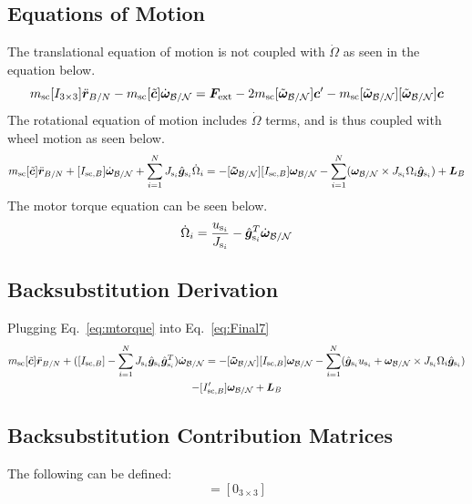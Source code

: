 \documentclass[]{BasiliskReportMemo}
\begin{document}
\subsection{Equations of Motion}
The translational equation of motion is not coupled with $\dot{\Omega}$ as seen in the equation below.
\begin{equation}
m_{\text{sc}} [I_{3 \times 3}]\ddot{\bm r}_{B/N}
-m_{\text{sc}} [\tilde{\bm{c}}] \dot{\bm\omega}_{\cal B/N}
= \bm F_{\text{ext}}- 2 m_{\text{sc}} [\tilde{\bm\omega}_{\cal B/N}] \bm c'
-m_{\text{sc}} [\tilde{\bm\omega}_{\cal B/N}][\tilde{\bm\omega}_{\cal B/N}]\bm{c}
\label{eq:Rbddot35}
\end{equation}
The rotational equation of motion includes $\dot{\Omega}$ terms, and is thus coupled with wheel motion as seen below.
\begin{multline}
m_{\text{sc}}[\tilde{\bm{c}}] \ddot{\bm r}_{B/N}
+[I_{\text{sc},B}] \dot{\bm\omega}_{\cal B/N}
+\sum_{i=1}^{N}J_{\text{s}_i} \hat{\bm g}_{\text{s}_i}\dot{\Omega}_i
= -[\bm{\tilde{\omega}}_{\cal B/N}] [I_{\text{sc},B}] \bm\omega_{\cal B/N} - \sum_{i=1}^{N}(\bm\omega_{\cal B/N}\times J_{\text{s}_i}\Omega_i\hat{\bm g}_{\text{s}_i})
+ \bm{L}_B
\label{eq:Final7}
\end{multline}
The motor torque equation can be seen below.
\begin{equation}
\dot{\Omega}_i = \frac{u_{\text{s}_i}}{J_{\text{s}_i}}-\hat{\bm g}_{\text{s}_i}^T \dot{\bm{\omega}}_{\cal B/N}
\label{eq:mtorque}
\end{equation}

\subsection{Backsubstitution Derivation}
Plugging Eq.~\eqref{eq:mtorque} into Eq.~\eqref{eq:Final7}
\begin{multline}
m_{\text{sc}}[\tilde{\bm{c}}] \ddot{\bm r}_{B/N}
+([I_{\text{sc},B}]-\sum_{i=1}^{N}J_{\text{s}_i} \hat{\bm g}_{\text{s}_i} \hat{\bm g}_{\text{s}_i}^T) \dot{\bm\omega}_{\cal B/N}
= -[\bm{\tilde{\omega}}_{\cal B/N}] [I_{\text{sc},B}] \bm\omega_{\cal B/N} - \sum_{i=1}^{N}(\hat{\bm g}_{\text{s}_i} u_{\text{s}_i} + \bm\omega_{\cal B/N}\times J_{\text{s}_i}\Omega_i\hat{\bm g}_{\text{s}_i})
\\- [I'_{\text{sc},B}] \bm\omega_{\cal B/N}
+ \bm{L}_B
\label{eq:Final72}
\end{multline}


\subsection{Backsubstitution Contribution Matrices}
The following can be defined:
\begin{equation}
[A_\text{contr}] = [0_{3 \times 3}]
\end{equation}
\end{document}
